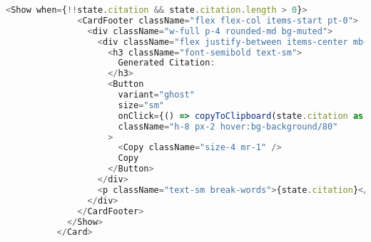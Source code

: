 \begin{lstlisting}[language=TypeScript, caption={Pembuatan Sitasi}, inputencoding=utf8]
            <Show when={!!state.citation && state.citation.length > 0}>
              <CardFooter className="flex flex-col items-start pt-0">
                <div className="w-full p-4 rounded-md bg-muted">
                  <div className="flex justify-between items-center mb-2">
                    <h3 className="font-semibold text-sm">
                      Generated Citation:
                    </h3>
                    <Button
                      variant="ghost"
                      size="sm"
                      onClick={() => copyToClipboard(state.citation as string)}
                      className="h-8 px-2 hover:bg-background/80"
                    >
                      <Copy className="size-4 mr-1" />
                      Copy
                    </Button>
                  </div>
                  <p className="text-sm break-words">{state.citation}</p>
                </div>
              </CardFooter>
            </Show>
          </Card>


\end{lstlisting}

